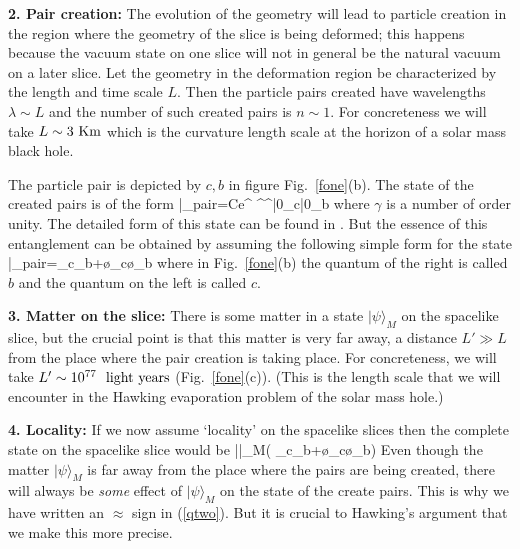 \documentclass[12pt]{article}
\begin{document}
{\bf 2. Pair creation:} The evolution of the geometry will lead to particle creation in the region where the geometry of the slice is being deformed; this happens because  the vacuum state on one slice will not in general be the natural vacuum on a later slice.  Let the geometry in the deformation region 
 be characterized by the length and time scale $L$. Then the particle pairs created have wavelengths $\lambda\sim L$
and the number of such created pairs is $n\sim 1$. For concreteness we will take 
$L\sim 3 ~{\rm Km}$
which is the curvature length scale at the horizon of a solar mass black hole.

The particle pair is depicted by $c, b$ in figure Fig.~\ref{fone}(b).
The state of the created pairs is of the form
 \be
 |\Psi\rangle_{\rm pair}=Ce^{ ^^\dagger}|0\rangle_c|0\rangle_b
 \label{actualstate}
 \ee
 where $\gamma$ is a number of order unity. The detailed form of this state can be found in \cite{hawking,giddings}. But the essence of this entanglement can be obtained by assuming the following simple form for the state
\be
|\Psi\rangle_{\rm pair}=\sq \z_c\z_b+\sq\o_c\o_b
\label{pairs}
\ee
where in Fig.~\ref{fone}(b)  the quantum of the right is called $b$ and the quantum on the left is called $c$. 


\b

{\bf 3. Matter on the slice:} There is some matter in a state $|\psi\rangle_M$ on the spacelike slice, but the crucial point is that this matter is very far away, a distance
$L'\gg L$
from the place where the pair creation is taking place. For concreteness, we will take
$L'\sim 10^{77} ~~{\rm light~years}$ (Fig.~\ref{fone}(c)).
(This is the length scale that we will encounter in the Hawking evaporation problem of the solar mass hole.)


\b

{\bf 4. Locality:} If we now assume  `locality' on the spacelike slices then the complete state on the spacelike slice would be
\be
|\Psi\rangle\approx |\psi\rangle_M\otimes\Big( \sq \z_c\z_b+\sq\o_c\o_b\Big)
\label{qtwo}
\ee
Even though the matter $|\psi\rangle_M$ is far away from the place where the pairs are being created, there will always be {\it some} effect of $|\psi\rangle_M$ on the state of the create pairs. This is why we have written an $\approx$ sign in (\ref{qtwo}). But it is crucial to Hawking's argument that we make this more precise.
\end{document}
